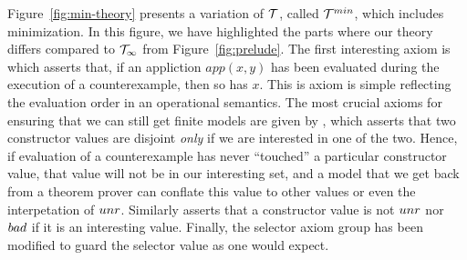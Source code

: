 Figure~\ref{fig:min-theory} presents a variation of ${\cal T}$, called ${\cal T}^{min}$, which includes minimization.
In this figure, we have highlighted the parts where our theory differs compared to ${\cal T}_\infty$ from
Figure~\ref{fig:prelude}. The first interesting axiom is  which asserts that, if an
appliction $app(x,y)$ has been evaluated during the execution of a counterexample, then so has $x$. This
is axiom is simple reflecting the evaluation order in an operational semantics. The most crucial axioms for
ensuring that we can still get finite models are given by , which asserts that two constructor
values are disjoint {\em only} if we are interested in one of the two. Hence, if evaluation of a counterexample
has never ``touched'' a particular constructor value, that value will not be in our interesting set, and a model
that we get back from a theorem prover can conflate this value to other values or even the interpetation of $\mathop{unr}$.
Similarly  asserts that a constructor value is not $\mathop{unr}$ nor $\mathop{bad}$ if it is an interesting value.
Finally, the selector axiom group  has been modified to guard the selector value as one would expect.


